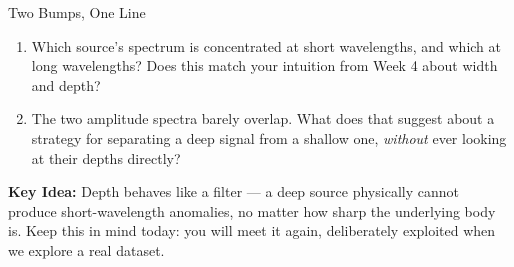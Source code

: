 \begin{activity}[Warm-up]{Two Bumps, One Line}
\begin{questions}[resume]
    \begin{enumerate}[label=\roman*]
        \item Which source's spectrum is concentrated at short wavelengths, and which at long wavelengths? Does this match your intuition from Week 4 about width and depth?
        \answerbox[2cm]

        \item The two amplitude spectra barely overlap. What does that suggest about a strategy for separating a deep signal from a shallow one, \emph{without} ever looking at their depths directly?
        \answerbox[2cm]
    \end{enumerate}
\end{questions}

\bigskip

\textbf{Key Idea:} Depth behaves like a filter --- a deep source physically cannot produce short-wavelength anomalies, no matter how sharp the underlying body is. Keep this in mind today: you will meet it again, deliberately exploited when we explore a real dataset.

\end{activity}
